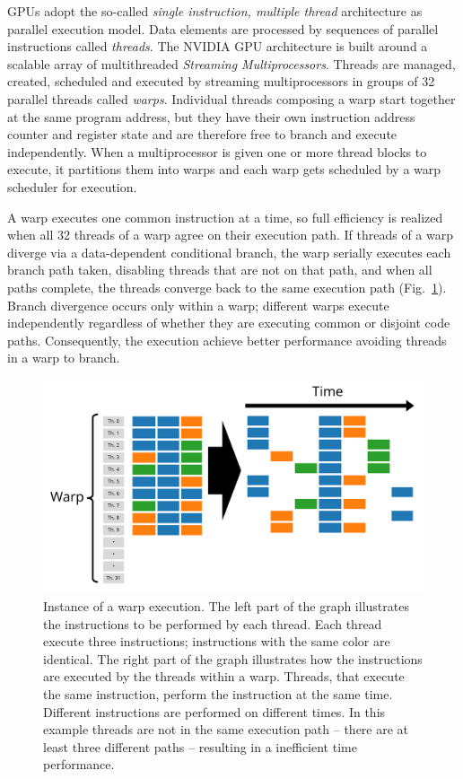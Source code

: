 GPUs adopt the so-called \textit{single instruction, multiple thread} architecture as parallel execution model. Data elements are processed by sequences of parallel instructions called \textit{threads}. The NVIDIA GPU architecture is built around a scalable array of multithreaded \textit{Streaming Multiprocessors}. Threads are managed, created, scheduled and executed by streaming multiprocessors in groups of 32 parallel threads called \textit{warps}. Individual threads composing a warp start together at the same program address, but they have their own instruction address counter and register state and are therefore free to branch and execute independently. When a multiprocessor is given one or more thread blocks to execute, it partitions them into warps and each warp gets scheduled by a warp scheduler for execution. 

A warp executes one common instruction at a time, so full efficiency is realized when all 32 threads of a warp agree on their execution path. If threads of a warp diverge via a data-dependent conditional branch, the warp serially executes each branch path taken, disabling threads that are not on that path, and when all paths complete, the threads converge back to the same execution path (Fig.~\ref{fig:warp-instruction}). Branch divergence occurs only within a warp; different warps execute independently regardless of whether they are executing common or disjoint code paths. Consequently, the execution achieve better performance avoiding threads in a warp to branch.
\begin{figure}
   \centering
   \includegraphics[width=12cm]{Figs/Warp_instruction.png}
   \caption{Instance of a warp execution. The left part of the graph illustrates the instructions to be performed by each thread. Each thread execute three instructions; instructions with the same color are identical. The right part of the graph illustrates how the instructions are executed by the threads within a warp. Threads, that execute the same instruction, perform the instruction at the same time. Different instructions are performed on different times. In this example threads are not in the same execution path -- there are at least three different paths -- resulting in a inefficient time performance.} \label{fig:warp-instruction}
\end{figure}


